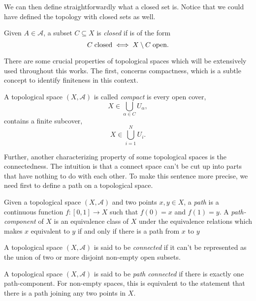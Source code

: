 We can then define straightforwardly what a closed set is. Notice that we could have defined the topology with closed sets as well.
\begin{definition}
    Given $A \in \mathcal{A}$, a subset $C \subseteq X$ is \emph{closed} if is of the form
    \begin{equation}
        C \; \textup{closed} \iff X \setminus C \; \textup{open} .
    \end{equation}
\end{definition}

There are some crucial properties of topological spaces which will be extensively used throughout this works. The first, concerns compactness, which is a subtle concept to identify finiteness in this context.
\begin{definition}[Compact]
    A topological space $(X,\mathcal{A})$ is called \emph{compact} is every open cover,
    \begin{equation}
        X \in \bigcup_{\alpha \in C} U_\alpha ,
    \end{equation}
    contains a finite subcover,
    \begin{equation}
        X \in \bigcup_{i = 1}^N U_i .
    \end{equation}
\end{definition}

Further, another characterizing property of some topological spaces is the connectedness. The intuition is that a connect space can't be cut up into parts that have nothing to do with each other. To make this sentence more precise, we need first to define a path on a topological space.

\begin{definition}[Path]
    Given a topological space $(X, \mathcal{A})$ and two points $x,y \in X$, a \emph{path} is a continuous function $f : [0,1] \to X$ such that $f(0)=x$ and $f(1)=y$. A \emph{path-component} of $X$ is an equivalence class of $X$ under the equivalence relations which makes $x$ equivalent to $y$ if and only if there is a path from $x$ to $y$
\end{definition}

\begin{definition}[Connected]
    A topological space $(X,\mathcal{A})$ is said to be \emph{connected} if it can't be represented as the union of two or more disjoint non-empty open subsets.
\end{definition}

\begin{definition}
    A topological space $(X,\mathcal{A})$ is said to be \emph{path connected} if there is exactly one path-component. For non-empty spaces, this is equivalent to the statement that there is a path joining any two points in $X$.
\end{definition}

